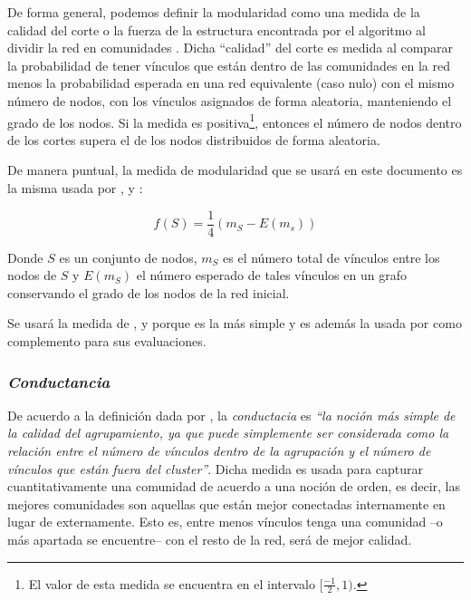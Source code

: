 \documentclass[12pt,letter]{article}
\begin{document}
De forma general, podemos definir la modularidad como una medida de la calidad del corte o la fuerza de la estructura encontrada por el algoritmo al dividir la red en comunidades \citep[Cap. 7]{Newman6}. Dicha ``calidad'' del corte es medida al comparar la probabilidad de tener vínculos que están dentro de las comunidades en la red menos la probabilidad esperada en una red equivalente (caso nulo) con el mismo número de nodos, con los vínculos asignados de forma aleatoria, manteniendo el grado de los nodos. Si la medida es positiva\footnote{El valor de esta medida se encuentra en el intervalo $[\frac{-1}{2},1)$.}, entonces el número de nodos dentro de los cortes supera el de los nodos distribuidos de forma aleatoria.

\vspace{0.5cm}

De manera puntual, la medida de modularidad que se usará en este documento es la misma usada por \cite{Yang}, \cite{Girvan2} y \cite{Newman4}:

\begin{equation}
 f(S)=\frac{1}{4}(m_{S}-E(m_s))
 \end{equation}
 
Donde $S$ es un conjunto de nodos, $m_S$ es el número total de vínculos entre los nodos de $S$ y $E(m_S)$ el número esperado de tales vínculos en un grafo conservando el grado de los nodos de la red inicial.

\vspace{0.5cm}
Se usará la medida de \cite{Yang}, \cite{Girvan2} y \cite{Newman4} porque es la más simple y es además la usada por \cite{Leskovec1} como complemento para sus evaluaciones.

\subsubsection{\emph{Conductancia}}

De acuerdo a la definición dada por \cite{Leskovec2}, la \emph{conductacia} es {\it ``la noción más simple de la calidad del agrupamiento, ya que puede simplemente ser considerada como la relación entre el número de vínculos dentro de la agrupación y el número de vínculos que están fuera del cluster''}. Dicha medida es usada para capturar cuantitativamente una comunidad de acuerdo a una noción de orden, es decir, las mejores comunidades son aquellas que están mejor conectadas internamente en lugar de externamente. Esto es, entre menos vínculos tenga una comunidad --o más apartada se encuentre-- con el resto de la red, será de mejor calidad.
\end{document}
